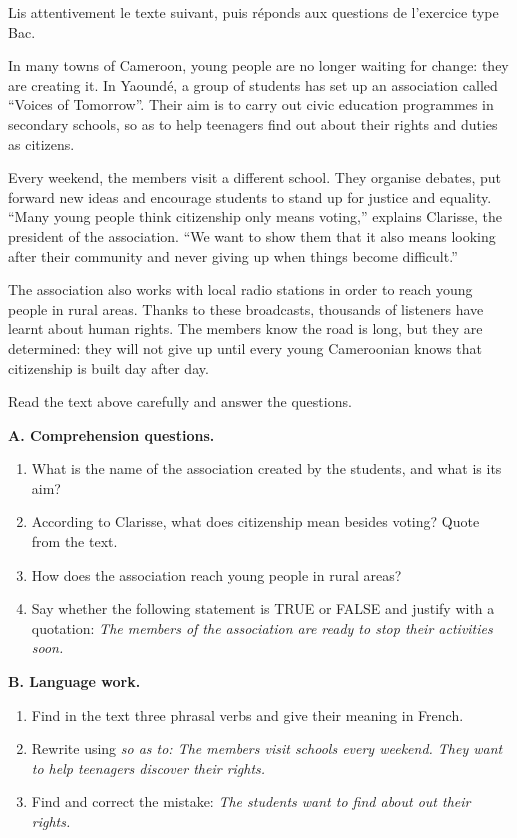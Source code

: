 \documentclass[11pt]{article}
\newcounter{popsec}
\newcounter{popsub}
\newcommand{\courssub}[1]{%
  \stepcounter{popsub}%
  \par\vspace{9pt}\noindent{\popxbold\fontsize{11.5}{13}\selectfont\color{popink}{\color{poporange}\thepopsec.\thepopsub}\hspace{6pt}#1}\par\nopagebreak\vspace{4pt}
}
\newcommand{\eng}[1]{\ifmmode\text{\textit{#1}}\else\begingroup\selectlanguage{english}\itshape #1\endgroup\fi}
\begin{document}
\courssub{Je me prépare au Bac}

Lis attentivement le texte suivant, puis réponds aux questions de l'exercice type Bac.

\begin{textebox}
In many towns of Cameroon, young people are no longer waiting for change: they are creating it. In Yaoundé, a group of students has set up an association called “Voices of Tomorrow”. Their aim is to carry out civic education programmes in secondary schools, so as to help teenagers find out about their rights and duties as citizens.

Every weekend, the members visit a different school. They organise debates, put forward new ideas and encourage students to stand up for justice and equality. “Many young people think citizenship only means voting,” explains Clarisse, the president of the association. “We want to show them that it also means looking after their community and never giving up when things become difficult.”

The association also works with local radio stations in order to reach young people in rural areas. Thanks to these broadcasts, thousands of listeners have learnt about human rights. The members know the road is long, but they are determined: they will not give up until every young Cameroonian knows that citizenship is built day after day.
\end{textebox}

\begin{exercice}
Read the text above carefully and answer the questions.

\textbf{A. Comprehension questions.}
\begin{enumerate}
\item What is the name of the association created by the students, and what is its aim?
\item According to Clarisse, what does citizenship mean besides voting? Quote from the text.
\item How does the association reach young people in rural areas?
\item Say whether the following statement is TRUE or FALSE and justify with a quotation: \emph{The members of the association are ready to stop their activities soon.}
\end{enumerate}

\textbf{B. Language work.}
\begin{enumerate}
\item Find in the text three phrasal verbs and give their meaning in French.
\item Rewrite using \eng{so as to}: \emph{The members visit schools every weekend. They want to help teenagers discover their rights.}
\item Find and correct the mistake: \emph{The students want to find about out their rights.}
\end{enumerate}
\end{exercice}
\end{document}
